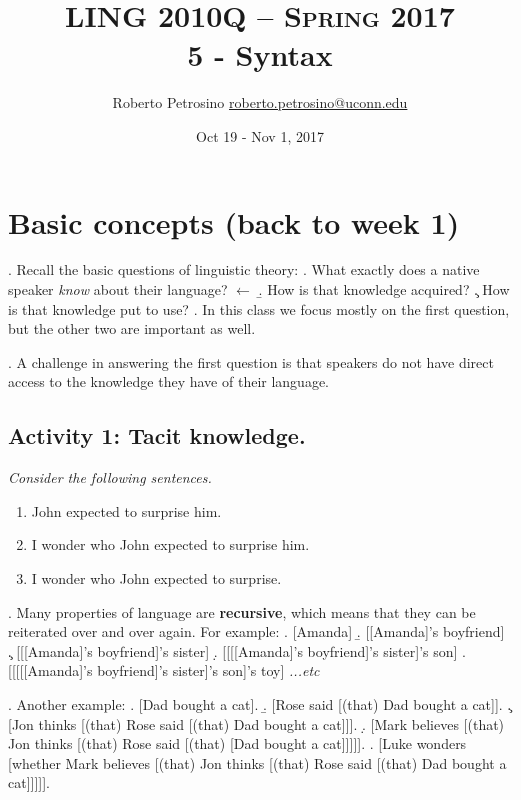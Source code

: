 \documentclass[11pt, oneside]{article}   	%
\title{{\normalsize LING 2010Q -- {\scshape Spring 2017}} \\ {\bfseries 5 - Syntax}}
\author{Roberto Petrosino \hspace{0.2cm} \url{roberto.petrosino@uconn.edu}}
\date{Oct 19 - Nov 1, 2017}
\begin{document}
\maketitle
\vspace{-1cm}
{\small \tableofcontents}

\newpage

\section{Basic concepts (back to week 1)}

\ex. Recall the basic questions of linguistic theory:
	\a. What exactly does a native speaker {\em know} about their language? $\leftarrow$
	\b. How is that knowledge acquired?
	\c. How is that knowledge put to use?
	\z.
In this class we focus mostly on the first question, but the other two are important as well.

\ex. A challenge in answering the first question is that speakers do not have direct access to the knowledge they have of their language. 

\subsection{Activity 1: Tacit knowledge.} 

{\itshape Consider the following sentences.}

\begin{enumerate}
\item John expected to surprise him.
\item I wonder who John expected to surprise him.
\item I wonder who John expected to surprise.
\end{enumerate}


\ex. Many properties of language are {\bfseries recursive}, which means that they can be reiterated over and over again. For example:
\a. {[}Amanda]
\b. {[[}Amanda]'s boyfriend]
\c. {[[[}Amanda]'s boyfriend]'s sister]
\d. {[[[[}Amanda]'s boyfriend]'s sister]'s son]
\e. {[[[[[}Amanda]'s boyfriend]'s sister]'s son]'s toy] \hfill {\itshape ...etc}

\ex. Another example:
\a. {[}Dad bought a cat].
\b. {[}Rose said [(that) Dad bought a cat]].
\c. {[}Jon thinks [(that) Rose said [(that) Dad bought a cat]]].
\d. {[}Mark believes [(that) Jon thinks [(that) Rose said [(that) [Dad bought a cat]]]]].
\e. {[}Luke wonders [whether Mark believes [(that) Jon thinks [(that) Rose said [(that) Dad bought a cat]]]]].
\end{document}
